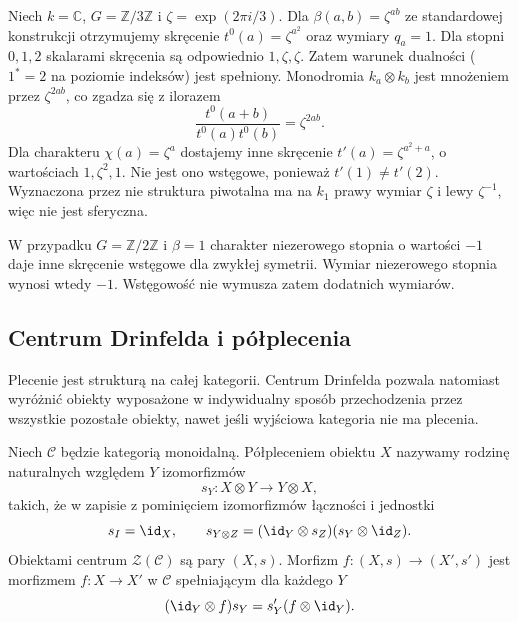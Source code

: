\begin{przyklad}\label{cat:ex:tf-cyclic-ribbon}
Niech $k=\mathbb C$, $G=\mathbb Z/3\mathbb Z$ i $\zeta=\exp(2\pi i/3)$. Dla $\beta(a,b)=\zeta^{ab}$ ze standardowej konstrukcji otrzymujemy skręcenie $t^0(a)=\zeta^{a^2}$ oraz wymiary $q_a=1$. Dla stopni $0,1,2$ skalarami skręcenia są odpowiednio $1,\zeta,\zeta$. Zatem warunek dualności ($1^*=2$ na poziomie indeksów) jest spełniony. Monodromia $k_a\otimes k_b$ jest mnożeniem przez $\zeta^{2ab}$, co zgadza się z ilorazem
\[
 \frac{t^0(a+b)}{t^0(a)t^0(b)}=\zeta^{2ab}.
\]
Dla charakteru $\chi(a)=\zeta^a$ dostajemy inne skręcenie $t'(a)=\zeta^{a^2+a}$, o wartościach $1,\zeta^2,1$. Nie jest ono wstęgowe, ponieważ $t'(1)\neq t'(2)$. Wyznaczona przez nie struktura piwotalna ma na $k_1$ prawy wymiar $\zeta$ i lewy $\zeta^{-1}$, więc nie jest sferyczna.

W przypadku $G=\mathbb Z/2\mathbb Z$ i $\beta=1$ charakter niezerowego stopnia o wartości $-1$ daje inne skręcenie wstęgowe dla zwykłej symetrii. Wymiar niezerowego stopnia wynosi wtedy $-1$. Wstęgowość nie wymusza zatem dodatnich wymiarów.
\end{przyklad}

\subsection{Centrum Drinfelda i półplecenia}

Plecenie jest strukturą na całej kategorii. Centrum Drinfelda pozwala natomiast wyróżnić obiekty wyposażone w indywidualny sposób przechodzenia przez wszystkie pozostałe obiekty, nawet jeśli wyjściowa kategoria nie ma plecenia.

\begin{definicja}\label{cat:def:tf-drinfeld-center}
Niech $\mathcal C$ będzie kategorią monoidalną. Półpleceniem obiektu $X$ nazywamy rodzinę naturalnych względem $Y$ izomorfizmów
\[
 s_Y:X\otimes Y\longrightarrow Y\otimes X,
\]
takich, że w zapisie z pominięciem izomorfizmów łączności i jednostki
\[
 s_I=\id_X,\qquad
 s_{Y\otimes Z}=(\id_Y\otimes s_Z)(s_Y\otimes\id_Z).
\]
Obiektami centrum $\mathcal Z(\mathcal C)$ są pary $(X,s)$. Morfizm $f:(X,s)\to(X',s')$ jest morfizmem $f:X\to X'$ w $\mathcal C$ spełniającym dla każdego $Y$
\[
 (\id_Y\otimes f)s_Y=s'_Y(f\otimes\id_Y).
\]
\end{definicja}

